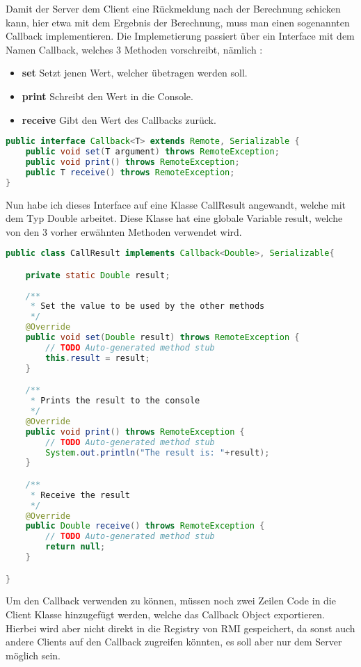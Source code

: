 Damit der Server dem Client eine Rückmeldung nach der Berechnung schicken kann, hier etwa mit dem Ergebnis der Berechnung, muss man einen sogenannten Callback implementieren. Die Implemetierung passiert über ein Interface mit dem Namen Callback, welches 3 Methoden vorschreibt, nämlich :
\begin{itemize}
	\item \textbf{set} Setzt jenen Wert, welcher übetragen werden soll.
	\item \textbf{print} Schreibt den Wert in die Console.
	\item \textbf{receive} Gibt den Wert des Callbacks zurück. 
\end{itemize}

\begin{lstlisting}[caption=Interface für das Callback, language=Java]
	public interface Callback<T> extends Remote, Serializable {
	public void set(T argument) throws RemoteException;
	public void print() throws RemoteException;
	public T receive() throws RemoteException;
}

\end{lstlisting}

Nun habe ich dieses Interface auf eine Klasse CallResult angewandt, welche mit dem Typ Double arbeitet. Diese Klasse hat eine globale Variable result, welche von den 3 vorher erwähnten Methoden verwendet wird.

\begin{lstlisting}[caption=CallResult Klasse, language=Java]
	public class CallResult implements Callback<Double>, Serializable{

	private static Double result; 
	
	/**
	 * Set the value to be used by the other methods
	 */
	@Override
	public void set(Double result) throws RemoteException {
		// TODO Auto-generated method stub
		this.result = result;
	}

	/**
	 * Prints the result to the console
	 */
	@Override
	public void print() throws RemoteException {
		// TODO Auto-generated method stub
		System.out.println("The result is: "+result);
	}

	/**
	 * Receive the result
	 */
	@Override
	public Double receive() throws RemoteException {
		// TODO Auto-generated method stub
		return null;
	}

}
\end{lstlisting}
\clearpage

Um den Callback verwenden zu können, müssen noch zwei Zeilen Code in die Client Klasse hinzugefügt werden, welche das Callback Object exportieren. Hierbei wird aber nicht direkt in die Registry von RMI gespeichert, da sonst auch andere Clients auf den Callback zugreifen könnten, es soll aber nur dem Server möglich sein.

